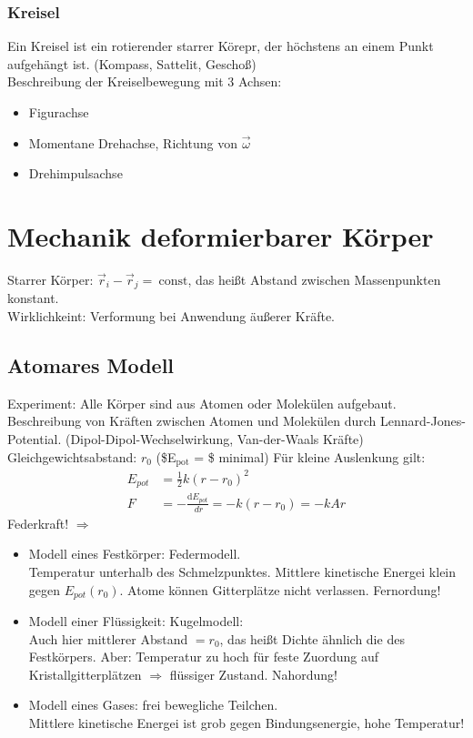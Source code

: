 \documentclass[a4paper]{scrartcl}
\renewcommand{\d}{\mathrm{d}}
\renewcommand{\v}[1]{\vec{#1}}
\newcommand{\dd}[2]{\frac{\d #1}{\ d#2}}
\theoremstyle{definition}
\theoremstyle{plain}
\theoremstyle{plain}
\theoremstyle{remark}
\theoremstyle{remark}
\theoremstyle{remark}
\begin{document}
\subsubsection{Kreisel}
\label{sec-8-8-1}
Ein Kreisel ist ein rotierender starrer Körepr, der höchstens an einem Punkt aufgehängt ist. (Kompass, Sattelit, Geschoß) \\
    Beschreibung der Kreiselbewegung mit 3 Achsen:
\begin{itemize}
\item Figurachse
\item Momentane Drehachse, Richtung von $\v \omega$
\item Drehimpulsachse
\end{itemize}
\section{Mechanik deformierbarer Körper}
\label{sec-9}
Starrer Körper: $\v r_i - \v r_j = ~\text{const}$, das heißt Abstand zwischen Massenpunkten konstant. \\
  Wirklichkeint: Verformung bei Anwendung äußerer Kräfte.
\subsection{Atomares Modell}
\label{sec-9-1}
Experiment: Alle Körper sind aus Atomen oder Molekülen aufgebaut.
Beschreibung von Kräften zwischen Atomen und Molekülen durch Lennard-Jones-Potential. (Dipol-Dipol-Wechselwirkung, Van-der-Waals Kräfte) \\
   Gleichgewichtsabstand: $r_0$ (\$E$_{\text{pot}}$ = \$ minimal)
Für kleine Auslenkung gilt:
\begin{align*}
E_{pot} &= \frac{1}{2}k(r - r_0)^2 \\
F &= -\dd{E_{pot}}{r} = -k(r - r_0) = -k Ar
\end{align*}
Federkraft!
$\Rightarrow$
\begin{itemize}
\item Modell eines Festkörper: Federmodell. \\
     Temperatur unterhalb des Schmelzpunktes. Mittlere kinetische Energei klein gegen $E_{pot}(r_0)$.
Atome können Gitterplätze nicht verlassen. Fernordung!
\item Modell einer Flüssigkeit: Kugelmodell: \\
     Auch hier mittlerer Abstand $= r_0$, das heißt Dichte ähnlich die des Festkörpers.
Aber: Temperatur zu hoch für feste Zuordung auf Kristallgitterplätzen $\Rightarrow$ flüssiger Zustand. Nahordung!
\item Modell eines Gases: frei bewegliche Teilchen. \\
     Mittlere kinetische Energei ist grob gegen Bindungsenergie, hohe Temperatur!
\end{itemize}
\end{document}

